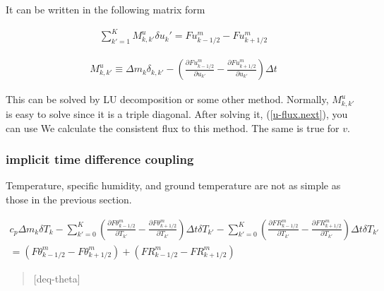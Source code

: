It can be written in the following matrix form

\begin{eqnarray}
  \sum_{k'=1}^{K} M^u_{k,k'} \delta u_k' = Fu^{m}_{k-1/2} - Fu^{m}_{k+1/2}
\end{eqnarray}

\begin{eqnarray}
M^u_{k,k'} \equiv \Delta m_k \delta_{k,k'}
          -  \left(  \frac{\partial Fu^{m}_{k-1/2}}{\partial u_{k'}} 
                   - \frac{\partial Fu^{m}_{k+1/2}}{\partial u_{k'}} \right) \Delta t
\end{eqnarray}

\begin{quote}
\protect\hypertarget{u-matrix}{}{\blazer[u-matrix]}
\end{quote}

This can be solved by LU decomposition or some other method. Normally,
\(M^u_{k,k'}\) is easy to solve since it is a triple diagonal. After
solving it, ({[}\protect\hyperlink{u-flux.next}{u-flux.next{]}}), you
can use We calculate the consistent flux to this method. The same is
true for \(v\).

\hypertarget{implicit-time-difference-coupling}{%
\subsubsection{implicit time difference
coupling}\label{implicit-time-difference-coupling}}

Temperature, specific humidity, and ground temperature are not as simple
as those in the previous section.

\begin{eqnarray}
  c_p \Delta m_k \delta T_k
   -  \sum_{k'=0}^{K}
                 \left(  \frac{\partial F\theta^{m}_{k-1/2}}{\partial T_{k'}} 
                       - \frac{\partial F\theta^{m}_{k+1/2}}{\partial T_{k'}} \right)
                 \Delta t\delta T_{k'}
  - \sum_{k'=0}^{K}
                 \left(  \frac{\partial FR^{m}_{k-1/2}}{\partial T_{k'}} 
                       - \frac{\partial FR^{m}_{k+1/2}}{\partial T_{k'}} \right)
                 \Delta t\delta T_{k'}  \\
  =   ( F\theta^{m}_{k-1/2} - F\theta^{m}_{k+1/2} )
  + ( FR^{m}_{k-1/2} - FR^{m}_{k+1/2} )
\end{eqnarray}

\begin{quote}
\protect\hypertarget{deq-theta}{}{{[}deq-theta{]}}
\end{quote}

